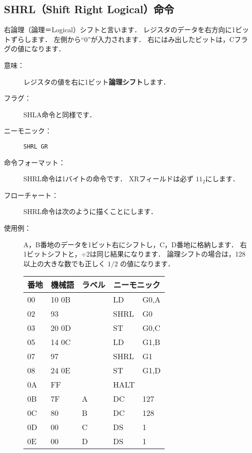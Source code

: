 \newpage
\subsection{SHRL（Shift Right Logical）命令}
右論理（論理＝Logical）シフトと言います．
レジスタのデータを右方向に1ビットずらします．
左側から``0''が入力されます．
右にはみ出したビットは，Cフラグの値になります．

\begin{center}
\end{center}

\begin{description}
\item[意味：]レジスタの値を右に1ビット{\bf 論理シフト}します．

\item[フラグ：]
SHLA命令と同様です．

\item[ニーモニック：]{\tt SHRL  GR}

\item[命令フォーマット：]SHRL命令は1バイトの命令です．
XRフィールドは必ず $11_2$にします．


\item[フローチャート：]SHRL命令は次のように描くことにします．

\begin{center}
\end{center}

\item[使用例：]
A，B番地のデータを1ビット右にシフトし，C，D番地に格納します．
右1ビットシフトと，$\div 2$は同じ結果になります．
論理シフトの場合は，128以上の大きな数でも正しく $1/2$ の値になります．

{\tt\begin{center}
\begin{tabular}{|l|l|l|l l|} \hline
番地 & 機械語 & ラベル & \multicolumn{2}{|c|}{ニーモニック} \\
\hline
00 & 10 0B &   & LD   & G0,A \\
02 & 93    &   & SHRL & G0   \\
03 & 20 0D &   & ST   & G0,C \\
05 & 14 0C &   & LD   & G1,B \\
07 & 97    &   & SHRL & G1   \\
08 & 24 0E &   & ST   & G1,D \\
0A & FF    &   & HALT &      \\
0B & 7F    & A & DC   & 127  \\
0C & 80    & B & DC   & 128  \\
0D & 00    & C & DS   & 1    \\
0E & 00    & D & DS   & 1    \\
\hline
\end{tabular}
\end{center}}
\end{description}

